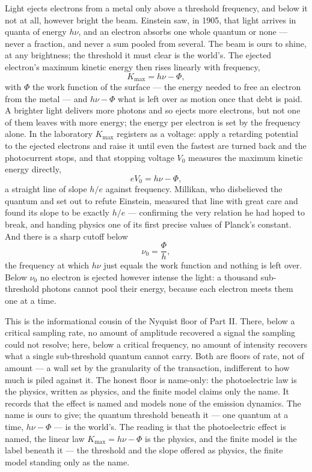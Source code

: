 Light ejects electrons from a metal only above a threshold frequency, and below it not at all, however bright
the beam. Einstein saw, in 1905, that light arrives in quanta of energy $h\nu$, and an electron
absorbs one whole quantum or none --- never a fraction, and never a sum pooled from several. The beam is ours
to shine, at any brightness; the threshold it must clear is the world's. The ejected
electron's maximum kinetic energy then rises linearly with frequency,
\begin{equation}
  K_{\max} = h\nu - \Phi,
\end{equation}
with $\Phi$ the work function of the surface --- the energy needed to free an electron from the metal --- and
$h\nu - \Phi$ what is left over as motion once that debt is paid. A brighter light delivers more photons and so
ejects more electrons, but not one of them leaves with more energy; the energy per electron is set by the
frequency alone. In the laboratory $K_{\max}$ registers as a voltage: apply a retarding potential to the ejected
electrons and raise it until even the fastest are turned back and the photocurrent stops, and that stopping
voltage $V_0$ measures the maximum kinetic energy directly,
\begin{equation}
  e V_0 = h\nu - \Phi,
\end{equation}
a straight line of slope $h/e$ against frequency. Millikan, who disbelieved the quantum and set out to refute
Einstein, measured that line with great care and found its slope to be exactly $h/e$ --- confirming the very
relation he had hoped to break, and handing physics one of its first precise values of Planck's constant. And
there is a sharp cutoff below
\begin{equation}
  \nu_0 = \frac{\Phi}{h},
\end{equation}
the frequency at which $h\nu$ just equals the work function and nothing is left over. Below $\nu_0$ no electron
is ejected however intense the light: a thousand sub-threshold photons cannot pool their energy, because each
electron meets them one at a time.

This is the informational cousin of the Nyquist floor of Part II. There, below a critical sampling rate, no
amount of amplitude recovered a signal the sampling could not resolve; here, below a critical frequency, no
amount of intensity recovers what a single sub-threshold quantum cannot carry. Both are floors of rate, not of
amount --- a wall set by the granularity of the transaction, indifferent to how much is piled against it. The
honest floor is name-only: the photoelectric law is the physics, written as physics, and the finite model
claims only the name. It records that the effect is named and models none of the emission dynamics. The name
is ours to give; the quantum threshold beneath it --- one quantum at a time, $h\nu - \Phi$ --- is the world's.
The reading is that the photoelectric effect is named, the linear law $K_{\max} = h\nu - \Phi$ is the physics, and
the finite model is the label beneath it --- the threshold and the slope offered as physics, the finite model
standing only as the name.

